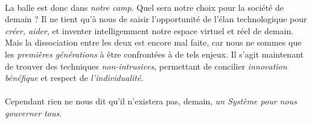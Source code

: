 \paragraph{} La balle est donc dans \emph{notre camp}. Quel sera
notre choix pour la société de demain ? Il ne tient qu'à nous de saisir
l'opportunité de l'élan technologique pour \emph{créer, aider}, et inventer
intelligemment notre espace virtuel et réel de demain. Mais la dissociation entre
les deux est encore mal faite, car nous ne sommes que les \emph{premières générations}
à être confrontées à de tels enjeux. Il s'agit maintenant de trouver des techniques
\emph{non-intrusives}, permettant de concilier \emph{innovation bénéfique} et
respect de \emph{l'individualité}.

\paragraph{} Cependant rien ne nous dit qu'il n'existera pas, demain, \emph{un Système pour nous
gouverner tous}.